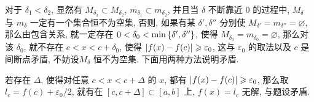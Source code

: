 \begin{exercise}[series=exer]
\begin{answer}
      对于 $ \delta_{1} < \delta_{2} $, 显然有 $ M_{\delta_{1}} \subset M_{\delta_{2}} $, $ m_{\delta_{1}} \subset m_{\delta_{2}} $, 并且当 $ \delta $ 不断靠近 $ 0 $ 的过程中, $ M_{\delta} $ 与 $ m_{\delta} $ 一定有一个集合恒不为空集, 否则, 如果有某 $ \delta', \delta'' $ 分别使 $ M_{\delta'} = m_{\delta''} = \varnothing $, 那么由包含关系, 就一定存在 $ 0 < \delta_{0} < \min\qty{\delta', \delta''} $, 使得 $ M_{\delta_{0}} = m_{\delta_{0}} = \varnothing $, 那么对该 $ \delta_{0} $, 就不存在 $ c < x < c + \delta_{0} $, 使得 $ \abs{f(x) - f(c)} \geqslant \varepsilon_{0} $, 这与 $ \varepsilon_{0} $ 的取法以及 $ c $ 是间断点矛盾, 不妨设$ M_{\delta} $ 恒不为空集. 下面用两种方法说明矛盾.
      \begin{method}
          \item 若存在 $ \Delta $, 使得对任意 $ c < x < c + \Delta $ 的 $ x $, 都有 $ \abs{f(x) - f(c)} \geqslant \varepsilon_{0} $, 那么取 $ l_{c} = f(c) + \varepsilon_{0}/2 $, 就有在 $ [c, c + \Delta] \subset [a, b] $ 上, $ f(x) = l_{c} $ 无解, 与题设矛盾.


\end{method}
\end{answer}
\end{exercise}
